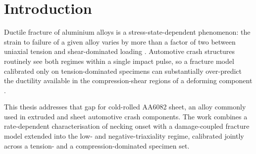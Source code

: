 \chapter{Introduction}
\label{Ch:Introduction}

Ductile fracture of aluminium alloys is a stress-state-dependent
phenomenon: the strain to failure of a given alloy varies by more than a
factor of two between uniaxial tension and shear-dominated loading
\citep{Bao.2004}. Automotive crash structures routinely see both regimes
within a single impact pulse, so a fracture model calibrated only on
tension-dominated specimens can substantially over-predict the ductility
available in the compression-shear regions of a deforming component
\citep{Bai.2010}.

This thesis addresses that gap for cold-rolled AA6082 sheet, an alloy
commonly used in extruded and sheet automotive crash components. The work
combines a rate-dependent characterisation of necking onset with a
damage-coupled fracture model extended into the low- and
negative-triaxiality regime, calibrated jointly across a tension- and a
compression-dominated specimen set.
